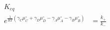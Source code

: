 \begin{eqnarray}
 K_{eq} \\
e^{\frac{1}{RT}\left(\gamma_C\mu_C^\circ+ \gamma_D\mu_D^\circ -\gamma_A\mu_A^\circ-\gamma_B\mu_B^\circ\right)}&  = \frac{k_+}{k_-} \\
\end{eqnarray}